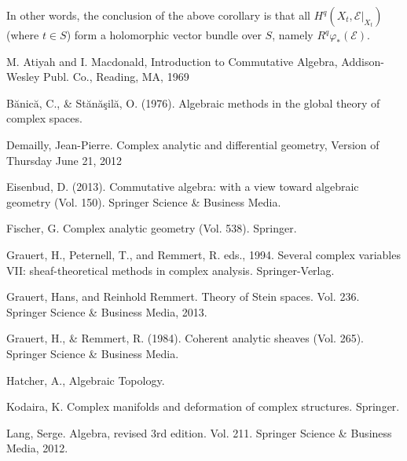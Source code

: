 \documentclass[12pt,b5paper,notitlepage]{report}
\theoremstyle{definition}
\theoremstyle{plain}
\newcommand{\scr}{\mathscr}
\numberwithin{equation}{section}
\begin{document}
In other words, the conclusion of the above corollary is that all $H^q(X_t,\scr E|_{X_t})$ (where $t\in S$) form a holomorphic vector bundle over $S$, namely $R^q\varphi_*(\scr E)$.













\newpage

\printindex	






	\begin{thebibliography}{999999}
		\footnotesize	


M. Atiyah and I. Macdonald, Introduction to Commutative Algebra, Addison-Wesley Publ. Co., Reading, MA, 1969

Bănică, C., \& Stănăşilă, O. (1976). Algebraic methods in the global theory of complex spaces.

Demailly, Jean-Pierre. Complex analytic and differential geometry, Version of Thursday June 21, 2012

Eisenbud, D. (2013). Commutative algebra: with a view toward algebraic geometry (Vol. 150). Springer Science \& Business Media.


Fischer, G.  Complex analytic geometry (Vol. 538). Springer.


Grauert, H., Peternell, T., and Remmert, R. eds., 1994. Several complex variables VII: sheaf-theoretical methods in complex analysis. Springer-Verlag.


Grauert, Hans, and Reinhold Remmert. Theory of Stein spaces. Vol. 236. Springer Science \& Business Media, 2013.


Grauert, H., \& Remmert, R. (1984). Coherent analytic sheaves (Vol. 265). Springer Science \& Business Media.

Hatcher, A., Algebraic Topology.

Kodaira, K.  Complex manifolds and deformation of complex structures. Springer.

Lang, Serge. Algebra, revised 3rd edition. Vol. 211. Springer Science \& Business Media, 2012.





\end{thebibliography}
\end{document}
